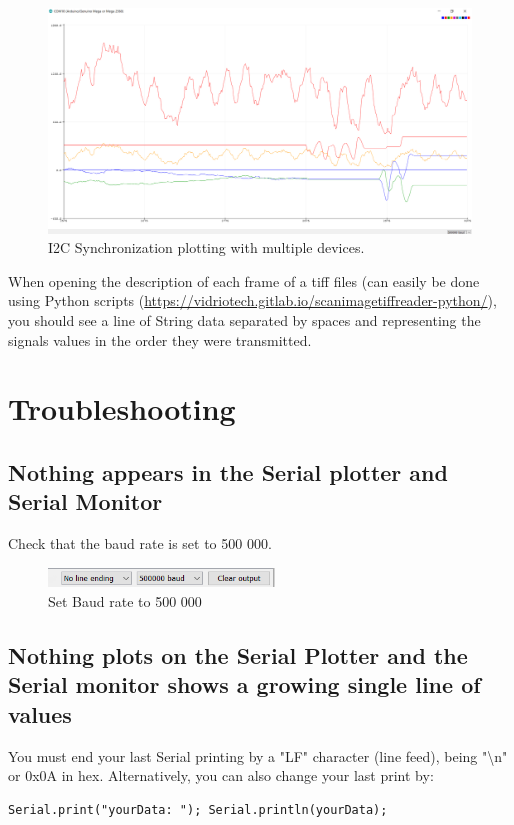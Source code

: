 \documentclass[a4paper]{article}
\begin{document}
\begin{figure}[h!b!t!]
    \centering
    \includegraphics[width=12cm]{images/plotting.png}
    \caption{I2C Synchronization plotting with multiple devices.}
    \label{fig:plotting}
\end{figure}

When opening the description of each frame of a tiff files (can easily be done using Python scripts (\url{https://vidriotech.gitlab.io/scanimagetiffreader-python/}), you should see a line of String data separated by spaces and representing the signals values in the order they were transmitted.

\section{Troubleshooting}
\subsection{Nothing appears in the Serial plotter and Serial Monitor}
Check that the baud rate is set to 500 000.

\begin{figure}[h!b!t!]
    \centering
    \includegraphics[width = 6cm]{images/baud.PNG}
    \caption{Set Baud rate to 500 000}
    \label{fig:baud}
\end{figure}

\subsection{Nothing plots on the Serial Plotter and the Serial monitor shows a growing single line of values}
You must end your last Serial printing by a "LF" character (line feed), being "\textbackslash n" or 0x0A in hex. Alternatively, you can also change your last print by: 
\begin{lstlisting}
Serial.print("yourData: "); Serial.println(yourData);
\end{lstlisting}
\end{document}
